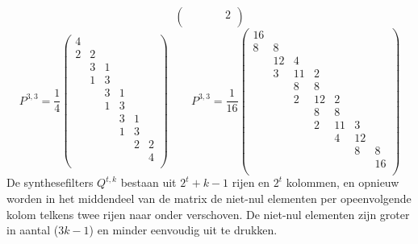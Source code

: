 \begin{enumerate}
$$\begin{pmatrix}
			  &   &   &   & 2\\
		\end{pmatrix}
		$$
		$$
		P^{3, 3} = \frac{1}{4}
		\begin{pmatrix}
			4 &   &   &   &   &   \\ %
			2 & 2 &   &   &   &   \\ %
			  & 3 & 1 &   &   &   \\ %
			  & 1 & 3 &   &   &   \\ %
			  &   & 3 & 1 &   &   \\ %
			  &   & 1 & 3 &   &   \\ %
			  &   &   & 3 & 1 &   \\ %
			  &   &   & 1 & 3 &   \\ %
			  &   &   &   & 2 & 2 \\ %
			  &   &   &   &   & 4 \\ %
		\end{pmatrix}
		\qquad
		P^{3, 3} = \frac{1}{16}
		\begin{pmatrix}
			16 &    &    &    &    &    &     \\ %
			8  & 8  &    &    &    &    &     \\ %
			   & 12 & 4  &    &    &    &     \\ %
			   & 3  & 11 &  2 &    &    &     \\ %
			   &    & 8  &  8 &    &    &     \\ %
			   &    & 2  & 12 & 2  &    &     \\ %
			   &    &    & 8  & 8  &    &     \\ %
			   &    &    & 2  & 11 &  3 &     \\ %
			   &    &    &    & 4  & 12 &     \\ %
			   &    &    &    &    &  8 &  8  \\ %
			   &    &    &    &    &    & 16  \\ %
		\end{pmatrix}
		$$
		De synthesefilters $Q^{t,k}$ bestaan uit $2^t +k - 1$ rijen en $2^t$ kolommen, en opnieuw worden in het middendeel van de matrix de niet-nul elementen per opeenvolgende kolom telkens twee rijen naar onder verschoven. De niet-nul elementen zijn groter in aantal ($3k - 1$) en minder eenvoudig uit te drukken. 
\end{enumerate}

